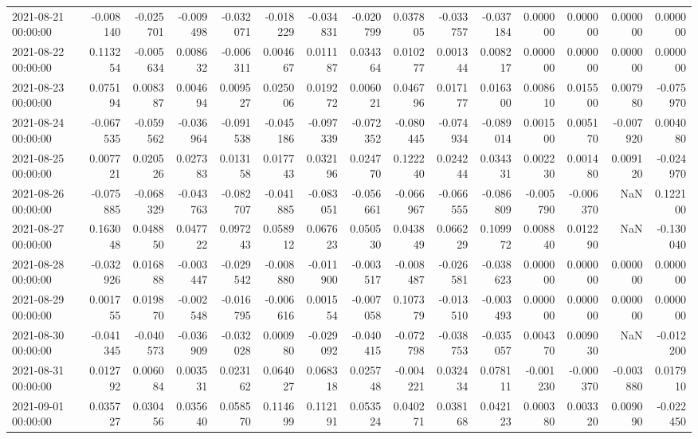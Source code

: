 \begin{tabular}{lrrrrrrrrrrrrrr}
2021-08-21 00:00:00 & -0.008140 & -0.025701 & -0.009498 & -0.032071 & -0.018229 & -0.034831 & -0.020799 & 0.037805 & -0.033757 & -0.037184 & 0.000000 & 0.000000 & 0.000000 & 0.000000 \\
2021-08-22 00:00:00 & 0.113254 & -0.005634 & 0.008632 & -0.006311 & 0.004667 & 0.011187 & 0.034364 & 0.010277 & 0.001344 & 0.008217 & 0.000000 & 0.000000 & 0.000000 & 0.000000 \\
2021-08-23 00:00:00 & 0.075194 & 0.008387 & 0.004694 & 0.009527 & 0.025006 & 0.019272 & 0.006021 & 0.046796 & 0.017177 & 0.016300 & 0.008610 & 0.015500 & 0.007980 & -0.075970 \\
2021-08-24 00:00:00 & -0.067535 & -0.059562 & -0.036964 & -0.091538 & -0.045186 & -0.097339 & -0.072352 & -0.080445 & -0.074934 & -0.089014 & 0.001500 & 0.005170 & -0.007920 & 0.004080 \\
2021-08-25 00:00:00 & 0.007721 & 0.020526 & 0.027383 & 0.013158 & 0.017743 & 0.032196 & 0.024770 & 0.122240 & 0.024244 & 0.034331 & 0.002230 & 0.001480 & 0.009120 & -0.024970 \\
2021-08-26 00:00:00 & -0.075885 & -0.068329 & -0.043763 & -0.082707 & -0.041885 & -0.083051 & -0.056661 & -0.066967 & -0.066555 & -0.086809 & -0.005790 & -0.006370 & NaN & 0.122100 \\
2021-08-27 00:00:00 & 0.163048 & 0.048850 & 0.047722 & 0.097243 & 0.058912 & 0.067623 & 0.050530 & 0.043849 & 0.066229 & 0.109972 & 0.008840 & 0.012290 & NaN & -0.130040 \\
2021-08-28 00:00:00 & -0.032926 & 0.016888 & -0.003447 & -0.029542 & -0.008880 & -0.011900 & -0.003517 & -0.008487 & -0.026581 & -0.038623 & 0.000000 & 0.000000 & 0.000000 & 0.000000 \\
2021-08-29 00:00:00 & 0.001755 & 0.019870 & -0.002548 & -0.016795 & -0.006616 & 0.001554 & -0.007058 & 0.107379 & -0.013510 & -0.003493 & 0.000000 & 0.000000 & 0.000000 & 0.000000 \\
2021-08-30 00:00:00 & -0.041345 & -0.040573 & -0.036909 & -0.032028 & 0.000980 & -0.029092 & -0.040415 & -0.072798 & -0.038753 & -0.035057 & 0.004370 & 0.009030 & NaN & -0.012200 \\
2021-08-31 00:00:00 & 0.012792 & 0.006084 & 0.003531 & 0.023162 & 0.064027 & 0.068318 & 0.025748 & -0.004221 & 0.032434 & 0.078111 & -0.001230 & -0.000370 & -0.003880 & 0.017910 \\
2021-09-01 00:00:00 & 0.035727 & 0.030456 & 0.035640 & 0.058570 & 0.114699 & 0.112191 & 0.053524 & 0.040271 & 0.038168 & 0.042123 & 0.000380 & 0.003320 & 0.009090 & -0.022450 \\

\end{tabular}
